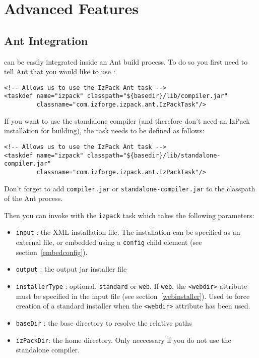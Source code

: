\chapter{Advanced Features}

\section{Ant Integration}
\label{ant-integration}

\IzPack can be easily integrated inside an Ant build process. To do so you
first need to tell Ant that you would like to use \IzPack{}:
\footnotesize
\begin{verbatim}
<!-- Allows us to use the IzPack Ant task -->
<taskdef name="izpack" classpath="${basedir}/lib/compiler.jar"
         classname="com.izforge.izpack.ant.IzPackTask"/>
\end{verbatim}
\normalsize

If you want to use the standalone compiler (and therefore don't need an
IzPack installation for building), the task needs to be defined as follows:
\footnotesize
\begin{verbatim}
<!-- Allows us to use the IzPack Ant task -->
<taskdef name="izpack" classpath="${basedir}/lib/standalone-compiler.jar"
         classname="com.izforge.izpack.ant.IzPackTask"/>
\end{verbatim}
\normalsize

Don't forget to add \texttt{compiler.jar} or \texttt{standalone-compiler.jar} 
to the classpath of the Ant process.

Then you can invoke \IzPack with the \texttt{izpack} task which takes the
following parameters:
\begin{itemize}

  \item \texttt{input} : the XML installation file. The installation can be
  specified as an external file, or embedded using a \texttt{config} child
  element (see section~\ref{embedconfig}).
  \item \texttt{output} : the output jar installer file
  \item \texttt{installerType} : optional. \texttt{standard} or
    \texttt{web}. If \texttt{web}, the \texttt{<webdir>} attribute
    must be specified in the input file (see
    section~\ref{webinstaller}). Used to force creation of a standard
    installer when the \texttt{<webdir>} attribute has been used.
  \item \texttt{baseDir} : the base directory to resolve the relative paths
  \item \texttt{izPackDir}: the \IzPack home directory. Only neccessary if
you do not use the standalone compiler.
  
\end{itemize}\

